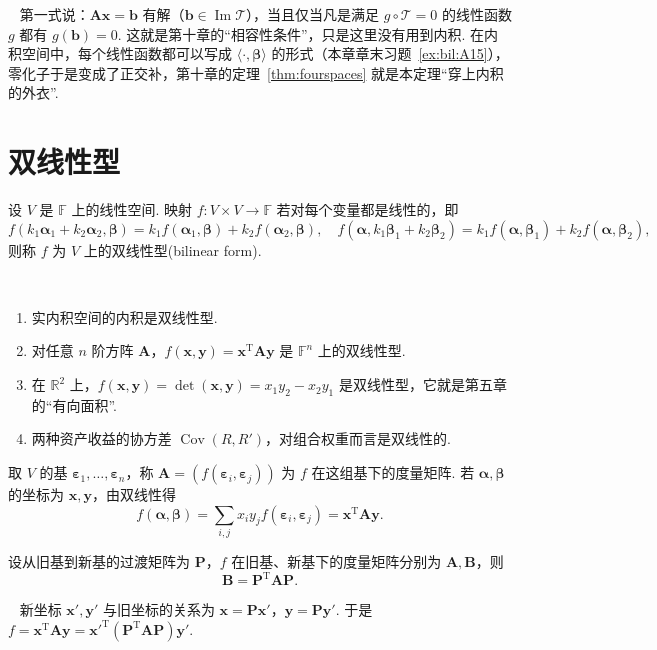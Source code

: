 \documentclass[lang=cn,10.5pt,scheme=chinese,toc=twocol,section,chinesefont=nofont,
twoside,citestyle=gb7714-2015,bibstyle=gb7714-2015]{elegantbook}
\DeclareRobustCommand{\textbf}[1]{{\lnsemiboldlatin\lnsemiboldcjk #1}}
\newcommand{\vv}[1]{\boldsymbol{#1}}
\newcommand{\trans}{\mathrm{T}}             %
\numberwithin{equation}{section}   %
\newcommand{\imm}{\operatorname{Im}}        %
\newcommand*{\lnlabel}[1]{{\sffamily\bfseries\color{black}#1}}
\renewenvironment{example}[1][]{%
	\refstepcounter{exam}%
	\par\noindent\lnlabel{\examplename\ \theexam\ifblank{#1}{}{\ #1}}\ \rmfamily}{%
	\par\ignorespacesafterend}
\renewenvironment{proof}{%
	\par\noindent\lnlabel{\proofname}\;\ \color{black!90}\cfs}{\par}
\renewenvironment{remark}{\noindent\lnlabel{\remarkname}\ }{\par}
\begin{document}
\begin{remark}
  第一式说：$\vv{Ax}=\vv b$ 有解（$\vv b\in\imm\mathscr T$），当且仅当凡是满足 $g\circ\mathscr T=0$ 的线性函数 $g$ 都有 $g(\vv b)=0$. 这就是第十章的“相容性条件”，只是这里没有用到内积. 在内积空间中，每个线性函数都可以写成 $\langle\cdot,\vv\beta\rangle$ 的形式（本章章末习题~\ref{ex:bil:A15}），零化子于是变成了正交补，第十章的定理~\ref{thm:fourspaces} 就是本定理“穿上内积的外衣”.
\end{remark}

\section{双线性型}

\begin{definition}
  设 $V$ 是 $\mathbb{F}$ 上的线性空间. 映射 $f:V\times V\to\mathbb{F}$ 若对每个变量都是线性的，即
  \[f(k_1\vv\alpha_1+k_2\vv\alpha_2,\vv\beta)=k_1f(\vv\alpha_1,\vv\beta)+k_2f(\vv\alpha_2,\vv\beta),\quad f(\vv\alpha,k_1\vv\beta_1+k_2\vv\beta_2)=k_1f(\vv\alpha,\vv\beta_1)+k_2f(\vv\alpha,\vv\beta_2),\]
  则称 $f$ 为 $V$ 上的\textbf{双线性型}(bilinear form).
\end{definition}

\begin{example}
  \begin{enumerate}
    \item 实内积空间的内积是双线性型.
    \item 对任意 $n$ 阶方阵 $\vv A$，$f(\vv x,\vv y)=\vv x^\trans\vv A\vv y$ 是 $\mathbb{F}^n$ 上的双线性型.
    \item 在 $\mathbb{R}^2$ 上，$f(\vv x,\vv y)=\det(\vv x,\vv y)=x_1y_2-x_2y_1$ 是双线性型，它就是第五章的“有向面积”.
    \item 两种资产收益的协方差 $\operatorname{Cov}(R,R')$，对组合权重而言是双线性的.
  \end{enumerate}
\end{example}

\begin{definition}
  取 $V$ 的基 $\vv\varepsilon_1,\ldots,\vv\varepsilon_n$，称 $\vv A=(f(\vv\varepsilon_i,\vv\varepsilon_j))$ 为 $f$ 在这组基下的\textbf{度量矩阵}. 若 $\vv\alpha,\vv\beta$ 的坐标为 $\vv x,\vv y$，由双线性得
  \[f(\vv\alpha,\vv\beta)=\sum_{i,j}x_iy_jf(\vv\varepsilon_i,\vv\varepsilon_j)=\vv x^\trans\vv A\vv y.\]
\end{definition}

\begin{theorem}
  \label{thm:bilinearchange}
  设从旧基到新基的过渡矩阵为 $\vv P$，$f$ 在旧基、新基下的度量矩阵分别为 $\vv A,\vv B$，则
  \[\vv B=\vv P^\trans\vv A\vv P.\]
\end{theorem}
\begin{proof}
  新坐标 $\vv x',\vv y'$ 与旧坐标的关系为 $\vv x=\vv P\vv x'$，$\vv y=\vv P\vv y'$. 于是 $f=\vv x^\trans\vv A\vv y=\vv x'^\trans(\vv P^\trans\vv A\vv P)\vv y'$.
\end{proof}
\end{document}
